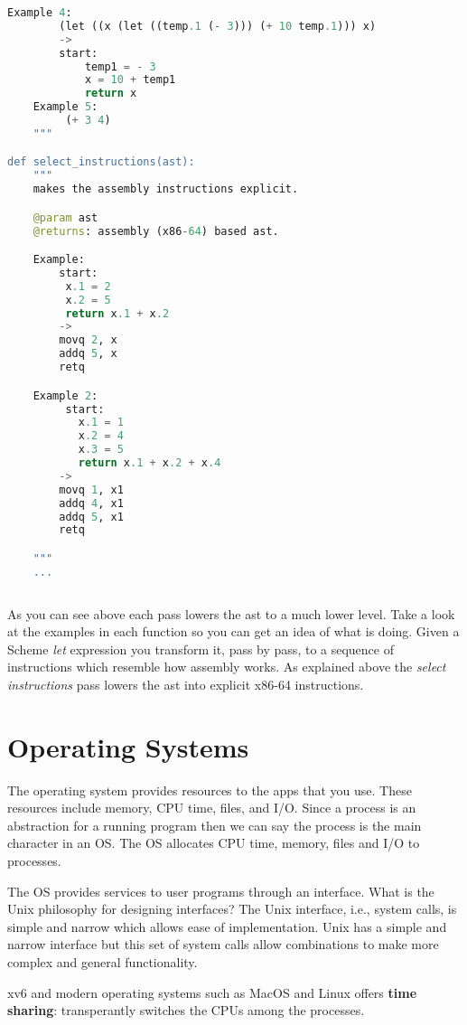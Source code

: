 \documentclass{amsbook}
\begin{document}
\begin{lstlisting}[language=python]
    Example 4:
        (let ((x (let ((temp.1 (- 3))) (+ 10 temp.1))) x)
        ->
        start:
            temp1 = - 3
            x = 10 + temp1
            return x
    Example 5:
         (+ 3 4)
    """

def select_instructions(ast):
    """
    makes the assembly instructions explicit.

    @param ast
    @returns: assembly (x86-64) based ast.

    Example:
        start:
         x.1 = 2
         x.2 = 5
         return x.1 + x.2
        ->
        movq 2, x
        addq 5, x
        retq

    Example 2:
         start:
           x.1 = 1
           x.2 = 4
           x.3 = 5
           return x.1 + x.2 + x.4
        ->
        movq 1, x1
        addq 4, x1
        addq 5, x1
        retq

    """
    ...
    
\end{lstlisting}

As you can see above each pass lowers the ast to a much lower level. Take a look at the examples in each function so you can get an idea of what is doing. Given a Scheme \textit{let} expression you transform it, pass by pass, to a sequence of instructions which resemble how assembly works. As explained above the \textit{select instructions} pass lowers the ast into explicit x86-64 instructions.

\chapter{Operating Systems}
The operating system provides resources to the apps that you use. These resources include memory, CPU time, files, and I/O. Since a process is an abstraction for a running program then we can say the process is the main character in an OS. The OS allocates CPU time, memory, files and I/O to processes.

The OS provides services to user programs through an interface. What is the Unix philosophy for designing interfaces? The Unix interface, i.e., system calls, is simple and narrow which allows ease of implementation. Unix has a simple and narrow interface but this set of system calls allow combinations to make more complex and general functionality.

xv6 and modern operating systems such as MacOS and Linux offers \textbf{time sharing}: transperantly switches the CPUs among the processes.
\end{document}
